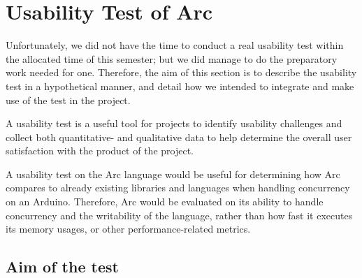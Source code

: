 \section{Usability Test of Arc}\label{subsec:usabilityTestOfArc}

Unfortunately, we did not have the time to conduct a real usability test within the allocated time of this semester; but we did manage to do the preparatory work needed for one. Therefore, the aim of this section is to describe the usability test in a hypothetical manner, and detail how we intended to integrate and make use of the test in the project.

A usability test is a useful tool for projects to identify usability challenges and collect both quantitative- and qualitative data to help determine the overall user satisfaction with the product of the project.

A usability test on the Arc language would be useful for determining how Arc compares to already existing libraries and languages when handling concurrency on an Arduino. Therefore, Arc would be evaluated on its ability to handle concurrency and the writability of the language, rather than how fast it executes its memory usages, or other performance-related metrics.




\subsection{Aim of the test}\label{subsubsec:aimOfTheTest}

